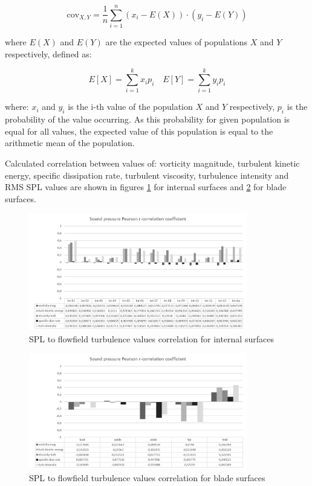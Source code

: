 \begin{equation} \label{eq:cov1}
\text{cov}_{X, Y} = \frac{1}{n} \sum_{i=1}^{n} \left(x_i - E \left( X \right) \right)\cdot \left(y_i - E \left( Y \right) \right)
\end{equation}

\noindent where $E(X)$ and $E(Y)$ are the expected values of populations $X$ and $Y$ respectively, defined as:

\begin{equation} \label{eq:exp1}
E \left[ X \right] = \sum_{i=1}^{k} x_i p_i \quad E \left[ Y \right] = \sum_{i=1}^{k} y_i p_i
\end{equation}

\noindent where: $x_i$ and $y_i$ is the i-th value of the population $X$ and $Y$ respectively, $p_i$ is the probability of the value occurring. As this probability for given population is equal for all values, the expected value of this population is equal to the arithmetic mean of the population.

Calculated correlation between values of: vorticity magnitude, turbulent kinetic energy, specific dissipation rate, turbulent viscosity, turbulence intensity and RMS SPL values are shown in figures \ref{spl_corr_int} for internal surfaces and \ref{spl_corr_blade} for blade surfaces.

\begin{figure}[h!]
\centering %
\includegraphics[width=0.85\textwidth]{Pictures/spl_pearson_int.png}
\caption{SPL to flowfield turbulence values correlation for internal surfaces}
\label{spl_corr_int}
\end{figure}

\begin{figure}[h!]
\centering %
\includegraphics[width=0.85\textwidth]{Pictures/spl_pearson_blade.png}
\caption{SPL to flowfield turbulence values correlation for blade surfaces}
\label{spl_corr_blade}
\end{figure}

